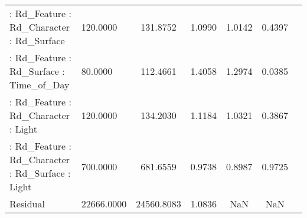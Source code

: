 \begin{longtable}{p{6cm}lccccc}
 : Rd\_Feature : Rd\_Character : Rd\_Surface         &   120.0000 &   131.8752 &   1.0990 &  1.0142 &     0.4397 \\
 : Rd\_Feature : Rd\_Surface : Time\_of\_Day          &    80.0000 &   112.4661 &   1.4058 &  1.2974 &     0.0385 \\
 : Rd\_Feature : Rd\_Character : Light              &   120.0000 &   134.2030 &   1.1184 &  1.0321 &     0.3867 \\
 : Rd\_Feature : Rd\_Character : Rd\_Surface : Light &   700.0000 &   681.6559 &   0.9738 &  0.8987 &     0.9725 \\
Residual                                          & 22666.0000 & 24560.8083 &   1.0836 &     NaN &        NaN \\
\end{longtable}
